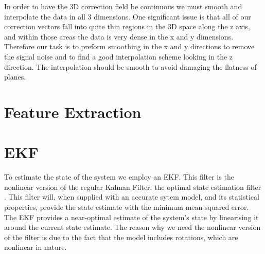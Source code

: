 \documentclass[]{article}
\begin{document}
{In order to have the 3D correction field be continuous we must smooth and interpolate the data in all 3 dimensions. One significant issue is that all of our correction vectors fall into quite thin regions in the 3D space along the z axis, and within those areas the data is very dense in the x and y dimensions. Therefore our task is to preform smoothing in the x and y directions to remove the signal noise and to find a good interpolation scheme looking in the z direction. The interpolation should be smooth to avoid damaging the flatness of planes. 
\clearpage

\section{Feature Extraction} %
\label{sec:feature_extraction}





\clearpage %
\section{EKF} %
\label{sec:ekf}

To estimate the state of the system we employ an \ac{EKF}. This filter is the nonlinear version of the regular Kalman Filter: the optimal state estimation filter \cite{todo}. This filter will, when supplied with an accurate sytem model, and its statistical properties, provide the state estimate with the minimum mean-squared error.
The \ac{EKF} provides a near-optimal estimate of the system's state by linearising it around the current state estimate. The reason why we need the nonlinear version of the filter is due to the fact that the model includes rotations, which are nonlinear in nature.

}
\end{document}
